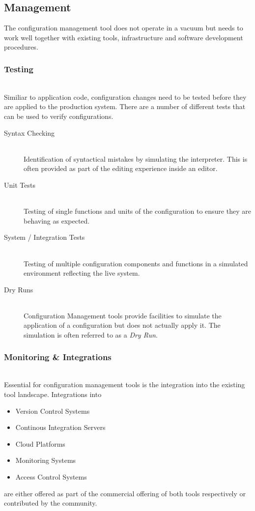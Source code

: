 \subsection{Management}

The configuration management tool does not operate in a vacuum but needs to work well together with existing tools, infrastructure and software development procedures.

\subsubsection{Testing}\hfill\\
Similiar to application code, configuration changes need to be tested before they are applied to the production system. There are a number of different tests that can be used to verify configurations.

\begin{description}
	
	\item[Syntax Checking] \hfill \\ 
	Identification of syntactical mistakes by simulating the interpreter. This is often provided as part of the editing experience inside an editor.
	
	\item[Unit Tests] \hfill \\
	Testing of single functions and units of the configuration to ensure they are behaving as expected.
	
	\item[System / Integration Tests]  \hfill \\
	Testing of multiple configuration components and functions in a simulated environment reflecting the live system.
	
	\item[Dry Runs] \hfill \\
	Configuration Management tools provide facilities to simulate the application of a configuration but does not actually apply it. The simulation is often referred to as a \textit{Dry Run}.	
	
\end{description}


\subsubsection{Monitoring \& Integrations}\hfill\\

Essential for configuration management tools is the integration into the existing tool landscape. Integrations into 

\begin{itemize}
\item Version Control Systems
\item Continous Integration Servers
\item Cloud Platforms
\item Monitoring Systems
\item Access Control Systems
\end{itemize}

are either offered as part of the commercial offering of both tools respectively or contributed by the community.

